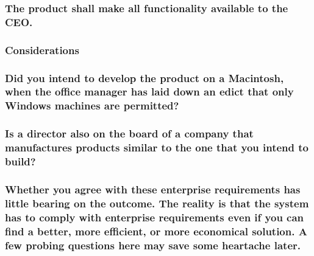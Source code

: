 \documentclass[
]{article}
\begin{document}
\hypertarget{the-product-shall-make-all-functionality-available-to-the-ceo.}{%
\subsubsection{The product shall make all functionality available to the
CEO.}\label{the-product-shall-make-all-functionality-available-to-the-ceo.}}

\hypertarget{considerations-9}{%
\subsubsection{Considerations}\label{considerations-9}}

\hypertarget{did-you-intend-to-develop-the-product-on-a-macintosh-when-the-office-manager-has-laid-down-an-edict-that-only-windows-machines-are-permitted}{%
\subsubsection{\texorpdfstring{Did you intend to develop the product on
a Macintosh, when the office manager has laid down an edict that only
Windows machines are permitted?
}{Did you intend to develop the product on a Macintosh, when the office manager has laid down an edict that only Windows machines are permitted? }}\label{did-you-intend-to-develop-the-product-on-a-macintosh-when-the-office-manager-has-laid-down-an-edict-that-only-windows-machines-are-permitted}}

\hypertarget{is-a-director-also-on-the-board-of-a-company-that-manufactures-products-similar-to-the-one-that-you-intend-to-build}{%
\subsubsection{Is a director also on the board of a company that
manufactures products similar to the one that you intend to
build?}\label{is-a-director-also-on-the-board-of-a-company-that-manufactures-products-similar-to-the-one-that-you-intend-to-build}}

\hypertarget{whether-you-agree-with-these-enterprise-requirements-has-little-bearing-on-the-outcome.-the-reality-is-that-the-system-has-to-comply-with-enterprise-requirements-even-if-you-can-find-a-better-more-efficient-or-more-economical-solution.-a-few-probing-questions-here-may-save-some-heartache-later.}{%
\subsubsection{Whether you agree with these enterprise requirements has
little bearing on the outcome. The reality is that the system has to
comply with enterprise requirements even if you can find a better, more
efficient, or more economical solution. A few probing questions here may
save some heartache
later.}\label{whether-you-agree-with-these-enterprise-requirements-has-little-bearing-on-the-outcome.-the-reality-is-that-the-system-has-to-comply-with-enterprise-requirements-even-if-you-can-find-a-better-more-efficient-or-more-economical-solution.-a-few-probing-questions-here-may-save-some-heartache-later.}}
\end{document}
